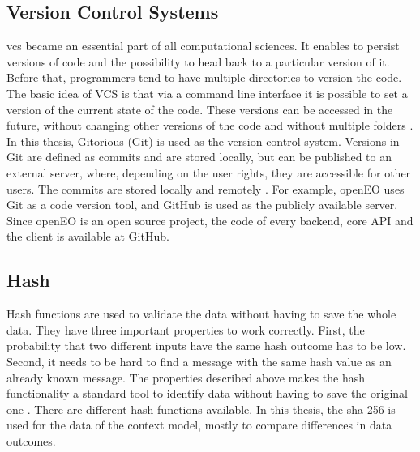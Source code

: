 \documentclass[draft,final]{vutinfth} %
\begin{document}
\subsection{Version Control Systems}\label{Version Control Systems}
\gls{vcs} became an essential part of all computational sciences. It enables to persist versions of code and the possibility to head back to a particular version of it. Before that, programmers tend to have multiple directories to version the code. The basic idea of VCS is that via a command line interface it is possible to set a version of the current state of the code. These versions can be accessed in the future, without changing other versions of the code and without multiple folders \cite{10.1109/MCSE.2009.194}. 
In this thesis, Gitorious (Git) is used as the version control system. Versions in Git are defined as commits and are stored locally, but can be published to an external server, where, depending on the user rights, they are accessible for other users. The commits are stored locally and remotely \cite{QuickGit}. For example, openEO uses Git as a code version tool, and GitHub is used as the publicly available server. Since openEO is an open source project, the code of every backend, core API and the client is available at GitHub. 

\subsection{Hash}\label{Hash}
Hash functions are used to validate the data without having to save the whole data. They have three important properties to work correctly. First, the probability that two different inputs have the same hash outcome has to be low. Second, it needs to be hard to find a message with the same hash value as an already known message. The properties described above makes the hash functionality a standard tool to identify data without having to save the original one \cite{3b412889270f46f59740fbf1ca8cd7e0}.  
There are different hash functions available. In this thesis, the \gls{sha}-256 is used for the data of the context model, mostly to compare differences in data outcomes.

\end{document}
